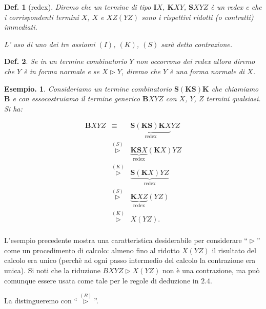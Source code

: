\documentclass{book}
\newtheorem{definizione}{Def.}[chapter]
\newtheorem{esempio}{Esempio.}
\newcommand*{\ii}{\mathbf{I}}    %
\newcommand*{\kk}{\mathbf{K}}    %
\newcommand*{\sss}{\mathbf{S}}   %
\newcommand*{\bb}{\mathbf{B}}    %
\begin{document}
\begin{definizione}[redex]
Diremo che un termine di tipo $\ii X$, $\kk XY$, $\sss XYZ$ \`e un \emph{redex}
 e  che i corrispondenti termini $X$, $X$ e $XZ(YZ)$ sono i rispettivi ridotti 
(o contratti) immediati.

L' uso di uno dei tre  assiomi $(I)$, $(K)$, $(S)$ sar\`a detto contrazione.
\end{definizione}

\begin{definizione}
Se in un termine combinatorio $Y$ non occorrono dei redex allora diremo che
$Y$ \`e  in \emph{forma normale} e se $X  \vartriangleright Y$, diremo che
$Y$ \`e una forma normale di $X$.
\end{definizione}

\begin{esempio}
Consideriamo un termine combinatorio $\sss(\kk\sss)\kk$ che chiamiamo $\bb$ e 
con essocostruiamo il termine generico $\bb XYZ$ con $X$, $Y$, $Z$ termini 
qualsiasi. 
Si ha:
\end{esempio}

\[
\begin{array}{lcl}
\bb XYZ & \equiv & \underbrace{\sss(\kk \sss)\kk X}_{\text{redex}}YZ \\
     & \stackrel{(S)}{\vartriangleright} & \underbrace{\kk\sss X}_{
       \text{redex}}(\kk X)YZ \\
     & \stackrel{(K)}{\vartriangleright} & \underbrace{\sss (\kk X)YZ}_{
       \text{redex}} \\
     & \stackrel{(S)}{\vartriangleright} & \underbrace{\kk XZ}_{
       \text{redex}}(YZ)  \\
     & \stackrel{(K)}{\vartriangleright} & X(YZ). \\
\end{array}
\]


L'esempio precedente mostra una caratteristica desiderabile per considerare
``$\vartriangleright$'' come un procedimento di calcolo: almeno fino al ridotto
$X(YZ)$ il risultato del calcolo era unico (perch\`e ad ogni passo intermedio
del calcolo la contrazione era unica). Si noti che la riduzione $BXYZ
\vartriangleright X(YZ)$ non \`e una contrazione, ma pu\`o comunque essere
usata come tale per le regole di deduzione in $2.4$. 

La distingueremo con 
``$\stackrel{(B)}{\vartriangleright}$''.
\end{document}
